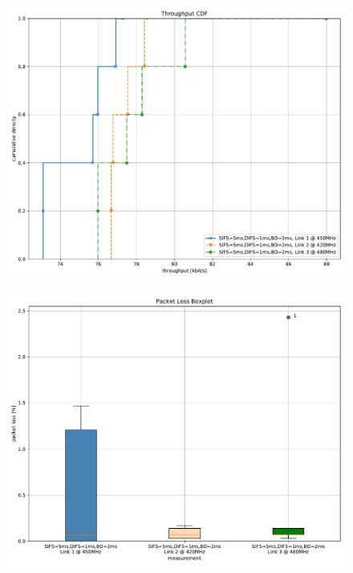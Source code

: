 \documentclass{article}
\begin{document}
\begin{figure}
	\includegraphics[width=\textwidth]{rb_low_single/cdf/throughput_cdf}
\end{figure}

\begin{figure}
	\includegraphics[width=\textwidth]{rb_low_single/boxplot/packet_loss_boxplot}
\end{figure}
\end{document}
